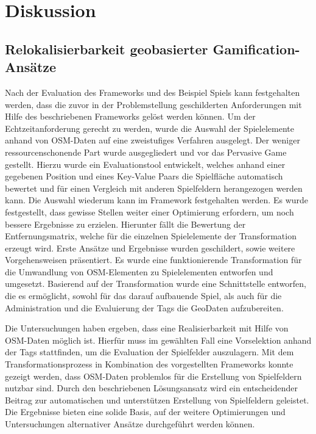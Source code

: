 \chapter{Diskussion}
\label{sec:S7_Diskussion}

\section{Relokalisierbarkeit geobasierter Gamification-Ansätze}

Nach der Evaluation des Frameworks und des Beispiel Spiels kann festgehalten werden, dass die zuvor in der Problemstellung geschilderten Anforderungen mit Hilfe des beschriebenen Frameworks gelöst werden können. Um der Echtzeitanforderung gerecht zu werden, wurde die Auswahl der Spielelemente anhand von OSM-Daten auf eine zweistufiges Verfahren ausgelegt. Der weniger ressourcenschonende Part wurde ausgegliedert und vor das Pervasive Game gestellt. Hierzu wurde ein Evaluationstool entwickelt, welches anhand einer gegebenen Position und eines Key-Value Paars die Spielfläche automatisch bewertet und für einen Vergleich mit anderen Spielfeldern herangezogen werden kann.
Die Auswahl wiederum kann im Framework festgehalten werden. Es wurde festgestellt, dass gewisse Stellen weiter einer Optimierung erfordern, um noch bessere Ergebnisse zu erzielen.
Hierunter fällt die Bewertung der Entfernungsmatrix, welche für die einzelnen Spielelemente der Transformation erzeugt wird. Erste Ansätze und Ergebnisse wurden geschildert, sowie weitere Vorgehensweisen präsentiert.
Es wurde eine funktionierende Transformation für die Umwandlung von OSM-Elementen zu Spielelementen entworfen und umgesetzt.
Basierend auf der Transformation wurde eine Schnittstelle entworfen, die es ermöglicht, sowohl für das darauf aufbauende Spiel, als auch für die Administration und die Evaluierung der Tags die GeoDaten aufzubereiten.

Die Untersuchungen haben ergeben, dass eine Realisierbarkeit mit Hilfe von OSM-Daten möglich ist. Hierfür muss im gewählten Fall eine Vorselektion anhand der Tags stattfinden, um die Evaluation der Spielfelder auszulagern. Mit dem Transformationsprozess in Kombination des vorgestellten Frameworks konnte gezeigt werden, dass OSM-Daten problemlos für die Erstellung von Spielfeldern nutzbar sind. Durch den beschriebenen Lösungsansatz wird ein entscheidender Beitrag zur automatischen und unterstützen Erstellung von Spielfeldern geleistet. Die Ergebnisse bieten eine solide Basis, auf der weitere Optimierungen  und Untersuchungen alternativer Ansätze durchgeführt werden können.

